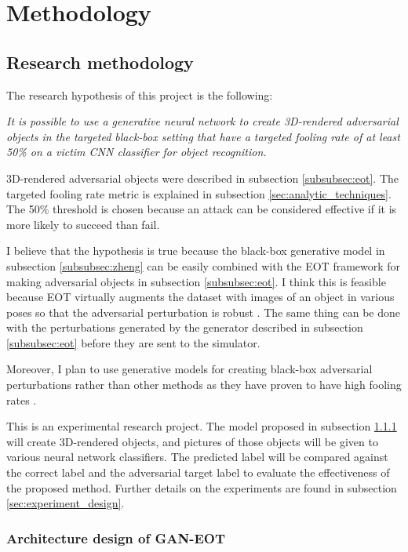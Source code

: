 \chapter{Methodology}
    \label{chap:methodology}
    
\section{Research methodology}

The research hypothesis of this project is the following: 

\textit{It is possible to use a generative neural network to create 3D-rendered adversarial objects in the targeted black-box setting that have a targeted fooling rate of at least 50\% on a victim CNN classifier for object recognition.}

\bigbreak
3D-rendered adversarial objects were described in subsection \ref{subsubsec:eot}. The targeted fooling rate metric is explained in subsection \ref{sec:analytic_techniques}. The 50\% threshold is chosen because an attack can be considered effective if it is more likely to succeed than fail.

I believe that the hypothesis is true because the black-box generative model in subsection \ref{subsubsec:zheng} can be easily combined with the EOT framework for making adversarial objects in subsection \ref{subsubsec:eot}. I think this is feasible because EOT virtually augments the dataset with images of an object in various poses so that the adversarial perturbation is robust \cite{athalye}. The same thing can be done with the perturbations generated by the generator described in subsection \ref{subsubsec:eot} before they are sent to the simulator.

Moreover, I plan to use generative models for creating black-box adversarial perturbations rather than other methods as they have proven to have high fooling rates \cite{upset_angri, zheng_black_box_GAN}.

This is an experimental research project. The model proposed in subsection \ref{subsubsec:architecture_design} will create 3D-rendered objects, and pictures of those objects will be given to various neural network classifiers. The predicted label will be compared against the correct label and the adversarial target label to evaluate the effectiveness of the proposed method. Further details on the experiments are found in subsection \ref{sec:experiment_design}.

\subsection{Architecture design of GAN-EOT}
    \label{subsubsec:architecture_design}
    
